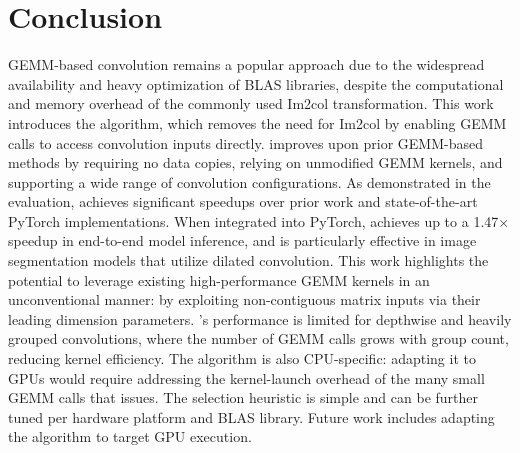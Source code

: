 \section{Conclusion}

GEMM-based convolution remains a popular approach due to the widespread availability and heavy optimization of BLAS libraries, despite the computational and memory overhead of the commonly used Im2col transformation.
This work introduces the \algname algorithm, which removes the need for Im2col by enabling GEMM calls to access convolution inputs directly.
\algname improves upon prior GEMM-based methods by requiring no data copies, relying on unmodified GEMM kernels, and supporting a wide range of convolution configurations.
As demonstrated in the evaluation, \algname achieves significant speedups over prior work and state-of-the-art PyTorch implementations.
When integrated into PyTorch, \algname achieves up to a 1.47$\times$ speedup in end-to-end model inference, and is particularly effective in image segmentation models that utilize dilated convolution.
This work highlights the potential to leverage existing high-performance GEMM kernels in an unconventional manner: by exploiting non-contiguous matrix inputs via their leading dimension parameters.
\algname's performance is limited for depthwise and heavily grouped convolutions, where the number of GEMM calls grows with group count, reducing kernel efficiency.
The algorithm is also CPU-specific: adapting it to GPUs would require addressing the kernel-launch overhead of the many small GEMM calls that \algname issues.
The selection heuristic is simple and can be further tuned per hardware platform and BLAS library.
Future work includes adapting the algorithm to target GPU execution.